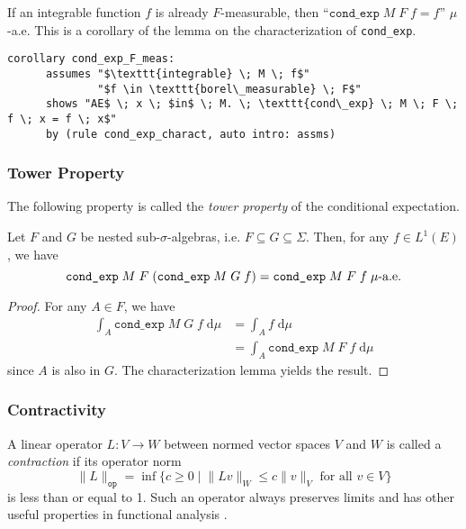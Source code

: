 If an integrable function $f$ is already $F$-measurable, then ``$\texttt{cond\_exp} \; M \; F \; f = f$'' $\mu$-a.e. This is a corollary of the lemma on the characterization of \texttt{cond\_exp}.
\begin{isacorollary}
{\small
	\begin{lstlisting}[style=isabelle]
	corollary cond_exp_F_meas:
	  assumes "$\texttt{integrable} \; M \; f$"
			  "$f \in \texttt{borel\_measurable} \; F$"
	  shows "AE$ \; x \; $in$ \; M. \; \texttt{cond\_exp} \; M \; F \; f \; x = f \; x$"
	  by (rule cond_exp_charact, auto intro: assms)
	\end{lstlisting}
}
\end{isacorollary}

\subsubsection{Tower Property}

The following property is called the \textit{tower property} of the conditional expectation.

\begin{lemma}
	Let $F$ and $G$ be nested sub-$\sigma$-algebras, i.e. $F \subseteq G \subseteq \Sigma$. Then, for any $f \in L^1(E)$, we have
	\[
		\normalfont \texttt{cond\_exp} \; M \; F \; (\texttt{cond\_exp} \; M \; G \; f) = \texttt{cond\_exp} \; M \; F \; f \; \mu\textrm{-a.e.}
	\]
\end{lemma}
\begin{proof}
	For any $A \in F$, we have
	\begin{align*}
		\int_A \texttt{cond\_exp} \; M \; G \; f \; \textrm{d} \mu &= \int_A f \; \textrm{d} \mu \\
		&= \int_A \texttt{cond\_exp} \; M \; F \; f \; \textrm{d} \mu
	\end{align*}
	since $A$ is also in $G$. The characterization lemma yields the result.
\end{proof}

\subsubsection{Contractivity}

A linear operator $L : V \rightarrow W$ between normed vector spaces $V$ and $W$ is called a \textit{contraction} if its operator norm
\[
	\lVert L \rVert_{\texttt{op}} = \inf\{ c \geq 0 \;\vert\; \lVert Lv \rVert_W \leq c \lVert v \rVert_V \textrm{ for all } v \in V \}
\]
is less than or equal to 1. Such an operator always preserves limits and has other useful properties in functional analysis \cite{sznagy2010}.

